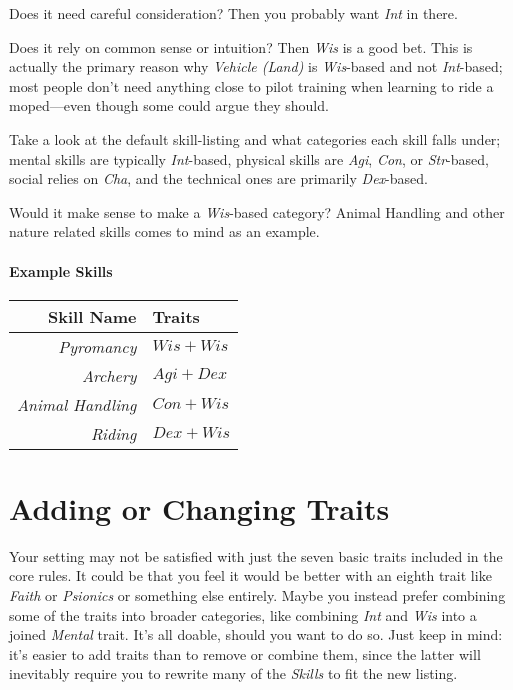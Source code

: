 Does it need careful consideration? Then you probably want \textit{Int} in there.

Does it rely on common sense or intuition? Then \textit{Wis} is a good bet.
This is actually the primary reason why \textit{Vehicle (Land)} is \textit{Wis}-based and not \textit{Int}-based; most people don't need anything close to pilot training when learning to ride a moped---even though some could argue they should.

Take a look at the default skill-listing and what categories each skill falls under; mental skills are typically \textit{Int}-based, physical skills are \textit{Agi}, \textit{Con}, or \textit{Str}-based, social relies on \textit{Cha}, and the technical ones are primarily \textit{Dex}-based.

Would it make sense to make a \textit{Wis}-based category? Animal Handling and other nature related skills comes to mind as an example.

\paragraph{Example Skills}
\begin{center}
\begin{tabular}{r|l}
    \textbf{Skill Name}      & \textbf{Traits} \\\hline
    \textit{Pyromancy}       & $Wis + Wis$\\
    \textit{Archery}         & $Agi + Dex$\\
    \textit{Animal Handling} & $Con + Wis$\\
    \textit{Riding}          & $Dex + Wis$\\
\end{tabular}
\end{center}

\section{Adding or Changing Traits}
Your setting may not be satisfied with just the seven basic traits included in the core rules.
It could be that you feel it would be better with an eighth trait like \textit{Faith} or \textit{Psionics} or something else entirely.
Maybe you instead prefer combining some of the traits into broader categories, like combining \textit{Int} and \textit{Wis} into a joined \textit{Mental} trait.
It's all doable, should you want to do so.
Just keep in mind: it's easier to add traits than to remove or combine them, since the latter will inevitably require you to rewrite many of the \textit{Skills} to fit the new listing.

